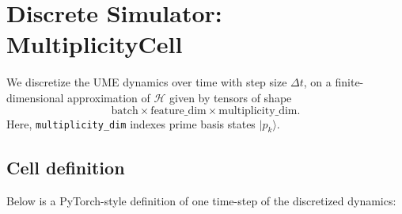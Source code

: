 \documentclass[11pt]{article}
\begin{document}
\section{Discrete Simulator: MultiplicityCell}

We discretize the UME dynamics over time with step size $\Delta t$, on a finite-dimensional approximation of $\mathcal{H}$ given by tensors of shape
\[
\text{batch} \times \text{feature\_dim} \times \text{multiplicity\_dim}.
\]
Here, \texttt{multiplicity\_dim} indexes prime basis states $\lvert p_k\rangle$.

\subsection{Cell definition}

Below is a PyTorch-style definition of one time-step of the discretized dynamics:
\end{document}
